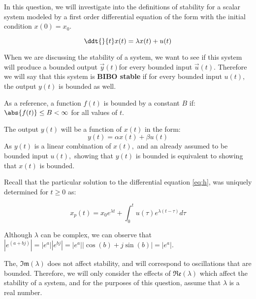 


In this question, we will investigate into the definitions of stability for a scalar system modeled by a first order differential equation of the form with the initial condition $x(0) = x_{0}.$ 

\begin{equation} \label{eq:h}
\ddt{}{t} x(t) = \lambda x(t) + u(t)
\end{equation}

When we are discussing the stability of a system, we want to see if this system will produce a bounded output $\vec{y}(t)$for every bounded input $\vec{u}(t).$ Therefore we will say that this system is \textbf{BIBO stable} if for every bounded input $u(t),$ the output $y(t)$ is bounded as well. 

As a reference, a function $f(t)$ is bounded by a constant $B$ if: $\abs{f(t)} \leq B < \infty$ for all values of $t.$

The output $y(t)$ will be a function of $x(t)$ in the form: 
\begin{equation}
y(t) = \alpha x(t) + \beta u(t)
\end{equation}
As $y(t)$ is a linear combination of $x(t),$ and an already assumed to be bounded input $u(t),$ showing that $y(t)$ is bounded is equivalent to showing that $x(t)$ is bounded.

Recall that the particular solution to the differential equation \eqref{eq:h}, was uniquely determined for $t \geq 0$ as:

\begin{equation} \label{eq:p}
x_{p}(t) = x_{0} e^{\lambda t} + \int_{0}^{t} u(\tau) e^{\lambda(t - \tau)} d\tau
\end{equation}

Although $\lambda$ can be complex, we can observe that $|e^{(a + bj)}| = |e^{a}| |e^{bj}| = |e^{a}| |\cos(b) + j \sin(b)| = |e^{a}|.$ 

The, $\mathfrak{Im}(\lambda)$ does not affect stability, and will correspond to oscillations that are bounded.
Therefore, we will only consider the effects of $\mathfrak{Re}(\lambda)$ which affect the stability of a system, 
and for the purposes of this question, assume that $\lambda$ is a real number.

